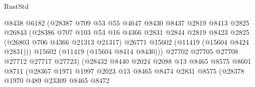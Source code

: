 \begin{lexlean}{RustStd}
\begin{coremodule}
                                  @8438
                                  @6182
                                  (@28387
                                    @709
                                    @53
                                    @55
                                    @4647
                                    @8430
                                    @8437
                                    @2819
                                    @8413
                                    @2825
                                    @26843
                                    (@28386
                                      @707
                                      @103
                                      @53
                                      @16
                                      @4366
                                      @2831
                                      @2844
                                      @2819
                                      @8423
                                      @2825
                                      (@26803 @706 @4366 @21313 @21317)
                                      @26771
                                      @15602
                                      (@11419 (@15604 @8424 @2831)))
                                    @15602
                                    (@11419 (@15604 @8414 @8430)))
                                  @27702
                                  @27705
                                  @27708
                                  @27712
                                  @27717
                                  @27723)
                                (@28432
                                  @8440
                                  @2024
                                  @2088
                                  @13
                                  @8465
                                  @8575
                                  @8601
                                  @8711
                                  (@28367
                                    @1971
                                    @1997
                                    @2023
                                    @13
                                    @8465
                                    @8474
                                    @2831
                                    @8575
                                    (@28378
                                      @1970
                                      @489
                                      @23309
                                      @8465
                                      @8472

\end{coremodule}
\end{lexlean}
